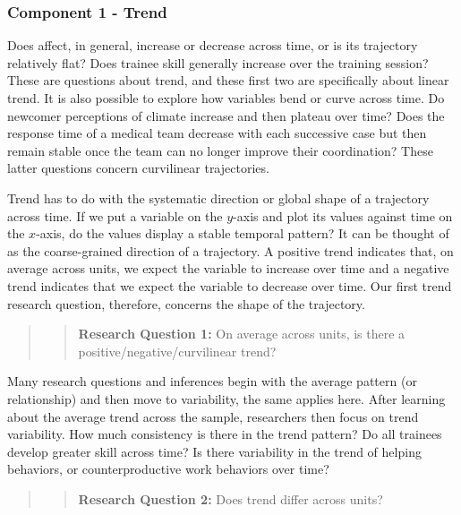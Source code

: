 \documentclass[english,,man]{apa6}
\theoremstyle{definition}
\theoremstyle{definition}
\theoremstyle{definition}
\theoremstyle{remark}
\begin{document}
\hypertarget{component-1---trend}{%
\subsubsection{Component 1 - Trend}\label{component-1---trend}}

Does affect, in general, increase or decrease across time, or is its
trajectory relatively flat? Does trainee skill generally increase over
the training session? These are questions about trend, and these first
two are specifically about linear trend. It is also possible to explore
how variables bend or curve across time. Do newcomer perceptions of
climate increase and then plateau over time? Does the response time of a
medical team decrease with each successive case but then remain stable
once the team can no longer improve their coordination? These latter
questions concern curvilinear trajectories.

Trend has to do with the systematic direction or global shape of a
trajectory across time. If we put a variable on the \(y\)-axis and plot
its values against time on the \(x\)-axis, do the values display a
stable temporal pattern? It can be thought of as the coarse-grained
direction of a trajectory. A positive trend indicates that, on average
across units, we expect the variable to increase over time and a
negative trend indicates that we expect the variable to decrease over
time. Our first trend research question, therefore, concerns the shape
of the trajectory.

\begin{quote}
\begin{quote}
\textbf{Research Question 1:} On average across units, is there a
positive/negative/curvilinear trend?
\end{quote}
\end{quote}

Many research questions and inferences begin with the average pattern
(or relationship) and then move to variability, the same applies here.
After learning about the average trend across the sample, researchers
then focus on trend variability. How much consistency is there in the
trend pattern? Do all trainees develop greater skill across time? Is
there variability in the trend of helping behaviors, or
counterproductive work behaviors over time?

\begin{quote}
\begin{quote}
\textbf{Research Question 2:} Does trend differ across units?
\end{quote}
\end{quote}
\end{document}
